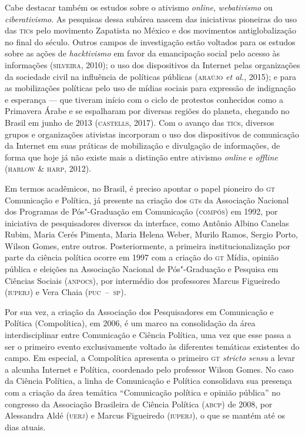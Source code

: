 {Cabe destacar também os estudos sobre o ativismo \textit{online},
\textit{webativismo} ou \textit{ciberativismo}. As pesquisas dessa subárea
nascem das iniciativas pioneiras do uso das \textsc{tic}s pelo movimento
Zapatista no México e dos movimentos antiglobalização no final do
século. Outros campos de investigação estão voltados para os estudos
sobre as ações de \textit{hacktivismo} em favor da emancipação social pelo
acesso às informações (\textsc{silveira}, 2010); o uso dos dispositivos da
Internet pelas organizações da sociedade civil na influência de
políticas públicas (\textsc{araújo} \textit{et al.}, 2015); e para as
mobilizações políticas pelo uso de mídias sociais para expressão de
indignação e esperança --- que tiveram início com o ciclo de protestos
conhecidos como a Primavera Árabe e se espalharam por diversas regiões
do planeta, chegando no Brasil em junho de 2013 (\textsc{castells}, 2017). Com o
avanço das \textsc{tic}s, diversos grupos e organizações ativistas incorporam o
uso dos dispositivos de comunicação da Internet em suas práticas de
mobilização e divulgação de informações, de forma que hoje já não existe
mais a distinção entre ativismo \textit{online} e \textit{offline} (\textsc{harlow
\& harp}, 2012).

Em termos acadêmicos, no Brasil, é preciso apontar o papel pioneiro do
\textsc{gt} Comunicação e Política, já presente na criação dos \textsc{gt}s da
Associação Nacional dos Programas de Pós"-Graduação em Comunicação
(\textsc{compós}) em 1992, por iniciativa de pesquisadores diversos da interface,
como Antônio Albino Canelas Rubim, Maria Cerés Pimenta, Maria Helena
Weber, Murilo Ramos, Sergio Porto, Wilson Gomes, entre outros.
Posteriormente, a primeira institucionalização por parte da ciência
política ocorre em 1997 com a criação do \textsc{gt} Mídia, opinião pública e
eleições na Associação Nacional de Pós"-Graduação e Pesquisa em
Ciências Sociais (\textsc{anpocs}), por intermédio dos professores Marcus
Figueiredo (\textsc{iuperj}) e Vera Chaia (\textsc{puc~--~sp}).

Por sua vez, a criação da Associação dos Pesquisadores em Comunicação e
Política (Compolítica), em 2006, é um marco na consolidação da área
interdisciplinar entre Comunicação e Ciência Política, uma vez que esse
passa a ser o primeiro evento exclusivamente voltado às diferentes
temáticas existentes do campo. Em especial, a Compolítica apresenta o
primeiro \textsc{gt} \textit{stricto sensu} a levar a alcunha Internet e
Política, coordenado pelo professor Wilson Gomes. No caso da Ciência
Política, a linha de Comunicação e Política consolidava sua presença com
a criação da área temática ``Comunicação política e opinião pública'' no
congresso da Associação Brasileira de Ciência Política (\textsc{abcp}) de 2008,
por Alessandra Aldé (\textsc{uerj}) e Marcus Figueiredo (\textsc{iuperj}), o que se mantém
até os dias atuais.

}
